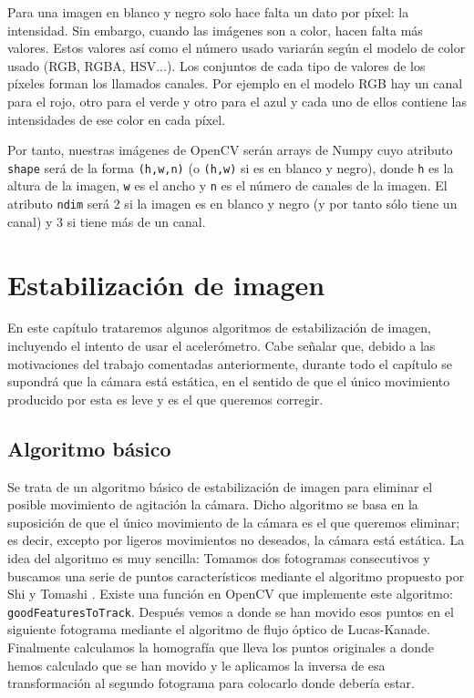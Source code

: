 \documentclass[a4paper,openright, 12pt]{book}
\begin{document}
Para una imagen en blanco y negro solo hace falta un dato por píxel: la intensidad. Sin embargo, cuando las imágenes son a color, hacen falta más valores. Estos valores así como el número usado variarán según el modelo de color usado (RGB, RGBA, HSV...). Los conjuntos de cada tipo de valores de los píxeles forman los llamados canales. Por ejemplo en el modelo RGB hay un canal para el rojo, otro para el verde y otro para el azul y cada uno de ellos contiene las intensidades de ese color en cada píxel.

Por tanto, nuestras imágenes de OpenCV serán arrays de Numpy cuyo atributo \lstinline|shape| será de la forma \lstinline|(h,w,n)| (o \lstinline|(h,w)| si es en blanco y negro), donde \lstinline|h| es la altura de la imagen, \lstinline|w| es el ancho y \lstinline|n| es el número de canales de la imagen. 
El atributo \lstinline|ndim| será 2 si la imagen es en blanco y negro (y por tanto sólo tiene un canal) y 3 si tiene más de un canal.
\chapter{Estabilización de imagen}\label{cap.estab}
En este capítulo trataremos algunos algoritmos de estabilización de imagen, incluyendo el intento de usar el acelerómetro.
Cabe señalar que, debido a las motivaciones del trabajo comentadas anteriormente, durante todo el capítulo se supondrá que la cámara está estática, en el sentido de que el único movimiento producido por esta es leve y es el que queremos corregir.
\section{Algoritmo básico}
Se trata de un algoritmo básico de estabilización de imagen para eliminar el posible movimiento de agitación la cámara. Dicho algoritmo se basa en la suposición de que el único movimiento de la cámara es el que queremos eliminar; es decir, excepto por ligeros movimientos no deseados, la cámara está estática.
La idea del algoritmo es muy sencilla: 
Tomamos dos fotogramas consecutivos y buscamos una serie de puntos característicos mediante el algoritmo propuesto por Shi y Tomashi \cite{shiandtomasi}. Existe una función en OpenCV que implemente este algoritmo: \lstinline|goodFeaturesToTrack|. Después vemos a donde se han movido esos puntos en el siguiente fotograma mediante el algoritmo de flujo óptico de Lucas-Kanade\cite{LucasKanade}.
Finalmente calculamos la homografía que lleva los puntos originales a donde hemos calculado que se han movido y le aplicamos la inversa de esa transformación al segundo fotograma para colocarlo donde debería estar.
\end{document}
